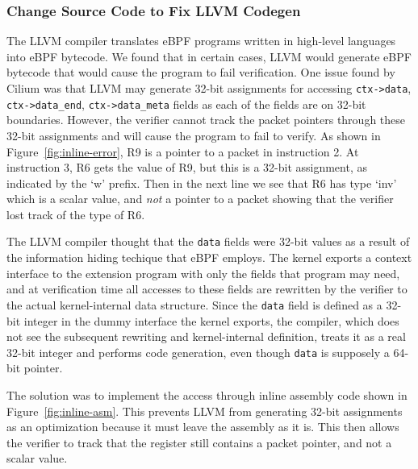 \subsubsection{Change Source Code to Fix LLVM Codegen}
\label{motivation:llvm-codegen}
The LLVM compiler translates eBPF programs written in high-level languages into eBPF bytecode.
We found that in certain cases, LLVM would generate eBPF bytecode that would cause the program to fail verification.
One issue found by Cilium was that LLVM may generate 32-bit assignments for
    accessing \texttt{ctx->data}, \texttt{ctx->data\_end}, \texttt{ctx->data\_meta} fields as
    each of the fields are on 32-bit boundaries.
However, the verifier cannot track the packet pointers through these 32-bit assignments and
    will cause the program to fail to verify.
As shown in Figure~\ref{fig:inline-error}, R9 is a pointer to a packet in instruction 2.
At instruction 3, R6 gets the value of R9, but this is a 32-bit assignment, as indicated by the `w' prefix.
Then in the next line we see that R6 has type `inv' which is a scalar value, and \emph{not} a pointer to a packet showing that the verifier lost track of the type of R6.

The LLVM compiler thought that the \texttt{data} fields were 32-bit values as 
    a result of the information hiding techique that
    eBPF employs.
The kernel exports a context interface to the extension program with only
    the fields that program may need, and at verification time all accesses to
    these fields are rewritten by the verifier to the actual kernel-internal
    data structure.
Since the \texttt{data} field is defined as a 32-bit integer in the dummy
    interface the kernel exports, the compiler, which does not see the
    subsequent rewriting and kernel-internal definition, treats it as a real
    32-bit integer and performs code generation, even though \texttt{data} is
    supposely a 64-bit pointer.

The solution was to implement the access through inline assembly code shown in Figure~\ref{fig:inline-asm}.
This prevents LLVM from generating 32-bit assignments as an optimization because it must leave the assembly as it is.
This then allows the verifier to track that the register still contains a packet pointer, and not a scalar value.


